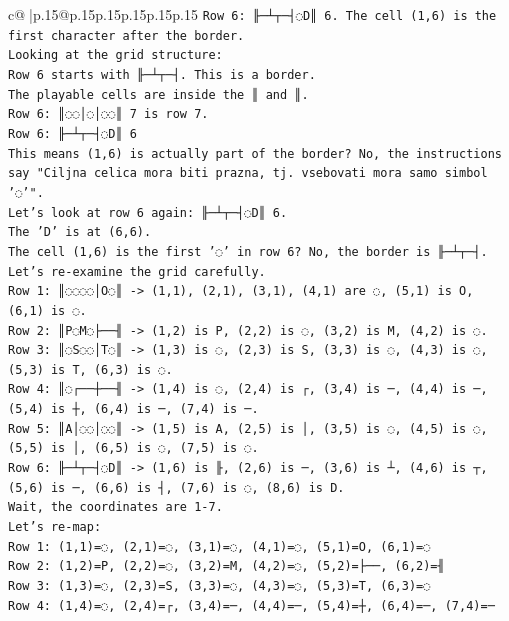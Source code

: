 \documentclass{article}
\begin{document}
{\begin{supertabular}{c@{$\;$}|p{.15\linewidth}@{}p{.15\linewidth}p{.15\linewidth}p{.15\linewidth}p{.15\linewidth}p{.15\linewidth}}
{{{\texttt{Row 6: ╟─┴┬─┤◌D║ 6. The cell (1,6) is the first character after the border.} \\
\texttt{Looking at the grid structure:} \\
\texttt{Row 6 starts with ╟─┴┬─┤. This is a border.} \\
\texttt{The playable cells are inside the ║ and ║.} \\
\texttt{Row 6: ║◌◌│◌│◌◌║ 7 is row 7.} \\
\texttt{Row 6: ╟─┴┬─┤◌D║ 6} \\
\texttt{This means (1,6) is actually part of the border? No, the instructions say "Ciljna celica mora biti prazna, tj. vsebovati mora samo simbol '◌'".} \\
\texttt{Let's look at row 6 again: ╟─┴┬─┤◌D║ 6.} \\
\texttt{The 'D' is at (6,6).} \\
\texttt{The cell (1,6) is the first '◌' in row 6? No, the border is ╟─┴┬─┤.} \\
\texttt{Let's re{-}examine the grid carefully.} \\
\texttt{Row 1: ║◌◌◌◌│O◌║ {-}> (1,1), (2,1), (3,1), (4,1) are ◌, (5,1) is O, (6,1) is ◌.} \\
\texttt{Row 2: ║P◌M◌├──╢ {-}> (1,2) is P, (2,2) is ◌, (3,2) is M, (4,2) is ◌.} \\
\texttt{Row 3: ║◌S◌◌│T◌║ {-}> (1,3) is ◌, (2,3) is S, (3,3) is ◌, (4,3) is ◌, (5,3) is T, (6,3) is ◌.} \\
\texttt{Row 4: ║◌┌──┼──╢ {-}> (1,4) is ◌, (2,4) is ┌, (3,4) is ─, (4,4) is ─, (5,4) is ┼, (6,4) is ─, (7,4) is ─.} \\
\texttt{Row 5: ║A│◌◌│◌◌║ {-}> (1,5) is A, (2,5) is │, (3,5) is ◌, (4,5) is ◌, (5,5) is │, (6,5) is ◌, (7,5) is ◌.} \\
\texttt{Row 6: ╟─┴┬─┤◌D║ {-}> (1,6) is ╟, (2,6) is ─, (3,6) is ┴, (4,6) is ┬, (5,6) is ─, (6,6) is ┤, (7,6) is ◌, (8,6) is D.} \\
\texttt{Wait, the coordinates are 1{-}7.} \\
\texttt{Let's re{-}map:} \\
\texttt{Row 1: (1,1)=◌, (2,1)=◌, (3,1)=◌, (4,1)=◌, (5,1)=O, (6,1)=◌} \\
\texttt{Row 2: (1,2)=P, (2,2)=◌, (3,2)=M, (4,2)=◌, (5,2)=├──, (6,2)=╢} \\
\texttt{Row 3: (1,3)=◌, (2,3)=S, (3,3)=◌, (4,3)=◌, (5,3)=T, (6,3)=◌} \\
\texttt{Row 4: (1,4)=◌, (2,4)=┌, (3,4)=─, (4,4)=─, (5,4)=┼, (6,4)=─, (7,4)=─} \\
}}}
\end{supertabular}}
\end{document}

